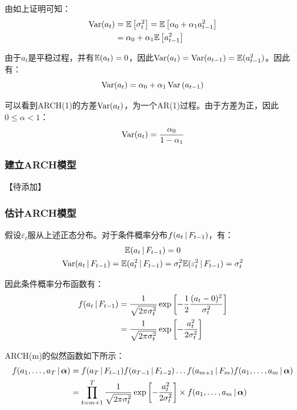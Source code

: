 \documentclass[11pt]{article}
\begin{document}
由如上证明可知：
\begin{align*}
    \operatorname{Var}(a_t) &= \mathbb{E}\left[\sigma_{t}^{2}\right]
    = \mathbb{E}\left[ \alpha_0 + \alpha_1 a_{t-1}^{2} \right] \\
    &= \alpha_0 + \alpha_1 \mathbb{E}\left[a_{t-1}^{2}\right]
\end{align*}

由于$a_t$是平稳过程，并有$\mathbb{E}(a_t) = 0$，因此$\operatorname{Var}(a_t) = \operatorname{Var}(a_{t-1}) = \mathbb{E}(a_{t-1}^{2})$。因此有：
\begin{equation*}
    \operatorname{Var}(a_t) = \alpha_0 + \alpha_1 \operatorname{Var}\left(a_{t-1}\right)
\end{equation*}

可以看到ARCH(1)的方差$\operatorname{Var}(a_t)$，为一个AR(1)过程。由于方差为正，因此$0 \leq\alpha <1$：
\begin{equation*}
    \operatorname{Var}(a_t) = \frac{\alpha_0}{1-\alpha_1}
\end{equation*}

\subsubsection{建立ARCH模型}

【待添加】

\subsubsection{估计ARCH模型}

假设$\varepsilon_t$服从上述正态分布。对于条件概率分布$f(a_t \,\vert\, F_{t-1})$，有：
\begin{gather*}
    \mathbb{E}(a_t \,\vert\, F_{t-1}) = 0 \\
    \operatorname{Var}(a_t \,\vert\, F_{t-1}) = \mathbb{E}(a_{t}^{2} \,\vert\, F_{t-1}) = \sigma_{t}^{2} \mathbb{E}(\varepsilon_{t}^{2} \,\vert\, F_{t-1}) = \sigma_{t}^{2}
\end{gather*}

因此条件概率分布函数有：
\begin{align*}
    f(a_t \,\vert\, F_{t-1}) 
    &= \frac{1}{\sqrt{2\pi\sigma_{t}^{2}}} \exp\left[ - \frac{1}{2} \frac{(a_t - 0)^2}{\sigma_{t}^{2}} \right]\\
    &= \frac{1}{\sqrt{2\pi\sigma_{t}^{2}}} \exp \left[ -\frac{a_{t}^{2}}{2\sigma_{t}^{2}} \right]
\end{align*}

ARCH(m)的似然函数如下所示：
\begin{align*}
    f(a_1,\dots,a_T \,\vert\, \bm{\alpha}) &= f(a_{T} \,\vert\, F_{t-1}) f(a_{T-1} \,\vert\, F_{t-2}) \dots f(a_{m+1} \,\vert\, F_{m}) f(a_1,\dots,a_m \,\vert\, \bm{\alpha}) \\
    &= \prod_{t=m+1}^{T} \frac{1}{\sqrt{2\pi\sigma_{t}^{2}}} \exp \left[ -\frac{a_{t}^{2}}{2\sigma_{t}^{2}} \right] \times f(a_1,\dots,a_m \,\vert\, \bm{\alpha})
\end{align*}
\end{document}
